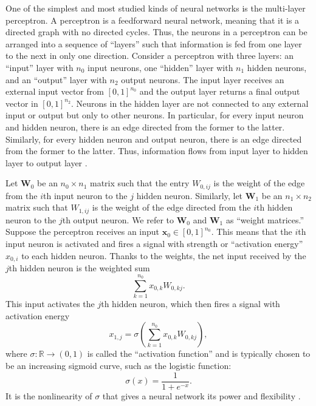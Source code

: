 \documentclass[12pt]{article}
\newcommand{\vecx}{\mathbf{x}}
\newcommand{\matW}{\mathbf{W}}
\newcommand{\RR}{\mathbb{R}}
\begin{document}
One of the simplest and most studied kinds of neural networks is the multi-layer perceptron. A perceptron is a feedforward neural network, meaning that it is a directed graph with no directed cycles. Thus, the neurons in a perceptron can be arranged into a sequence of ``layers'' such that information is fed from one layer to the next in only one direction. Consider a perceptron with three layers: an ``input'' layer with $n_0$ input neurons, one ``hidden'' layer with $n_1$ hidden neurons, and an ``output'' layer with $n_2$ output neurons. The input layer receives an external input vector from $[0,1]^{n_0}$ and the output layer returns a final output vector in $[0,1]^{n_2}$. Neurons in the hidden layer are not connected to any external input or output but only to other neurons. In particular, for every input neuron and hidden neuron, there is an edge directed from the former to the latter. Similarly, for every hidden neuron and output neuron, there is an edge directed from the former to the latter. Thus, information flows from input layer to hidden layer to output layer \cite{wikipedia}.

Let $\matW_0$ be an $n_0\times n_1$ matrix such that the entry $W_{0,ij}$ is the weight of the edge from the $i$th input neuron to the $j$ hidden neuron. Similarly, let $\matW_1$ be an $n_1\times n_2$ matrix such that $W_{1,ij}$ is the weight of the edge directed from the $i$th hidden neuron to the $j$th output neuron. We refer to $\matW_0$ and $\matW_1$ as ``weight matrices.'' Suppose the perceptron receives an input $\vecx_0 \in [0, 1]^{n_0}$. This means that the $i$th input neuron is activated and fires a signal with strength or ``activation energy'' $x_{0,i}$ to each hidden neuron. Thanks to the weights, the net input received by the $j$th hidden neuron is the weighted sum
\[ \sum_{k=1}^{n_0} x_{0,k} W_{0,kj}. \]
This input activates the $j$th hidden neuron, which then fires a signal with activation energy
\[ x_{1,j} = \sigma\left( \sum_{k=1}^{n_0} x_{0,k} W_{0,kj} \right), \]
where $\sigma:\RR\to(0, 1)$ is called the ``activation function'' and is typically chosen to be an increasing sigmoid curve, such as the logistic function:
\[ \sigma(x) = \frac{1}{1+e^{-x}}. \]
 It is the nonlinearity of $\sigma$ that gives a neural network its power and flexibility \cite{perceptron}.
\end{document}
